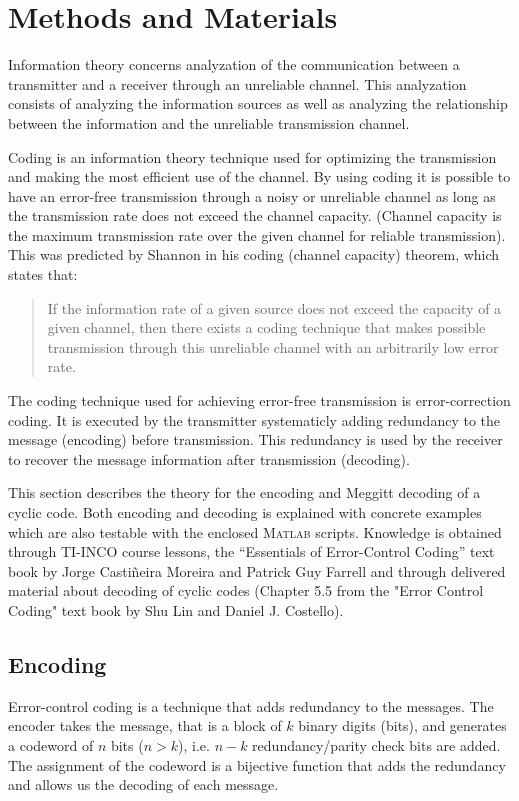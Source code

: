 \documentclass[Main]{subfiles}
\begin{document}
\section{Methods and Materials}
Information theory concerns analyzation of the communication between a transmitter and a receiver through an unreliable channel. This analyzation consists of analyzing the information sources as well as analyzing the relationship between the information and the unreliable transmission channel. 

Coding is an information theory technique used for optimizing the transmission and making the most efficient use of the channel. By using coding it is possible to have an error-free transmission through a noisy or unreliable channel as long as the transmission rate does not exceed the channel capacity. (Channel capacity is the maximum transmission rate over the given channel for reliable transmission). This was predicted by Shannon in his coding (channel capacity) theorem, which states that: 

 \begin{quotation} \noindent If the information rate of a given source does not exceed the capacity of a given channel, then there exists a coding technique that makes possible transmission through this unreliable channel with an arbitrarily low error rate. \end{quotation}
 
The coding technique used for achieving error-free transmission is error-correction coding. It is executed by the transmitter systematicly adding redundancy to the message (encoding) before transmission. This redundancy is used by the receiver to recover the message information after transmission (decoding). 

This section describes the theory for the encoding and Meggitt decoding of a cyclic code. 
Both encoding and decoding is explained with concrete examples which are also testable with the enclosed \textsc{Matlab} scripts. 
Knowledge is obtained through TI-INCO course lessons, the ``Essentials of Error-Control Coding'' text book by Jorge Casti\~{n}eira Moreira and Patrick Guy Farrell and through delivered material about decoding of cyclic codes (Chapter 5.5 from the "Error Control Coding" text book by Shu Lin and Daniel J. Costello). 

\subsection{Encoding}
Error-control coding is a technique that adds redundancy to the messages. The encoder takes the message, that is a block of $k$ binary digits (bits), and generates a codeword of $n$ bits ($n > k$), i.e. $n - k$ redundancy/parity check bits are added. The assignment of the codeword is a bijective function that adds the redundancy and allows us the decoding of each message. 
\end{document}
